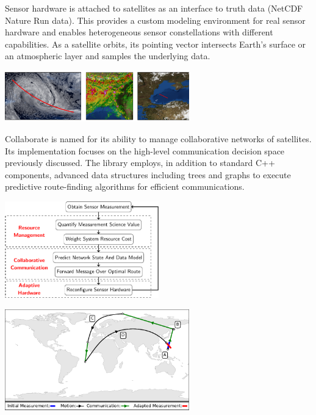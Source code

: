 \documentclass[11pt]{article}
\begin{document}
Sensor hardware is attached to satellites as an interface to truth data (NetCDF
Nature Run data).  This provides a custom modeling environment for real sensor
hardware and enables heterogeneous sensor constellations with different
capabilities.  As a satellite orbits, its pointing vector intersects Earth's
surface or an atmospheric layer and samples the underlying data.

\begin{center}
\includegraphics[width=0.6\textwidth]{./images/remote_sensing.pdf}
\end{center}

Collaborate is named for its ability to manage collaborative networks of
satellites.  Its implementation focuses on the high-level communication decision
space previously discussed.  The library employs, in addition to standard C++
components, advanced data structures including trees and graphs to execute
predictive route-finding algorithms for efficient communications.

\begin{center}
\includegraphics[width=0.5\textwidth]{./images/flowchart.pdf}
\end{center}

\begin{center}
\includegraphics[width=0.6\textwidth]{./images/collaborate.pdf}
\end{center}
\end{document}
